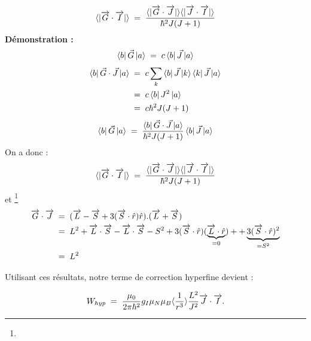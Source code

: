 \begin{equation*}
    \langle |\overrightarrow{G}\cdot\overrightarrow{I}| \rangle \; = \;  \dfrac{\langle |\overrightarrow{G}\cdot\overrightarrow{J}| \rangle\langle |\overrightarrow{J}\cdot\overrightarrow{I}| \rangle}{\hbar^2J(J+1)}
\end{equation*}
\textbf{Démonstration :}\\
\begin{equation*}
    \bra{b}\vec{G}\ket{a}
    \; = \; c\bra{b}\vec{J}\ket{a}
\end{equation*}
\begin{align*}
    \bra{b}\vec{G} \cdot \vec{J}\ket{a}
    &\; = \;  c\sum_k \bra{b}\vec{J}\ket{k}\bra{k}\vec{J}\ket{a}\\
    &\; = \;  c\bra{b}J^2\ket{a}\\
    &\; = \;  c\hbar^2 J(J+1)
\end{align*}
\begin{equation*}
    \bra{b}\vec{G}\ket{a} \; = \; \dfrac{\bra{b}\vec{G} \cdot \vec{J}\ket{a}}{\hbar^2 J(J+1)}\bra{b}\vec{J}\ket{a}
\end{equation*}
On a donc :
\begin{equation*}
    \langle |\overrightarrow{G}\cdot\overrightarrow{I}| \rangle \; = \;  \dfrac{\langle |\overrightarrow{G}\cdot\overrightarrow{J}| \rangle\langle |\overrightarrow{J}\cdot\overrightarrow{I}| \rangle}{\hbar^2J(J+1)}
\end{equation*}
et \footnote{}
\begin{align*}
    \overrightarrow{G}\cdot\overrightarrow{J} 
    &\; = \;  (\overrightarrow{L}-\overrightarrow{S}+3(\overrightarrow{S}\cdot\hat{r})\hat{r}).(\overrightarrow{L}+\overrightarrow{S})\\ 
    &\; = \; L^2 + \overrightarrow{L}\cdot\overrightarrow{S} -\overrightarrow{L}\cdot\overrightarrow{S} - S^2 + 3 (\overrightarrow{S}\cdot\hat{r})(\underbrace{\overrightarrow{L}\cdot\hat{r}}_{= 0}) + +\underbrace{3(\overrightarrow{S}\cdot\hat{r})^2}_{=S^2}\\
    &\; = \;  L^2
\end{align*}

Utilisant ces résultats, notre terme de correction hyperfine devient : 

\begin{equation}
    W_{hyp} \; = \;  \dfrac{\mu_0}{2\pi\hbar^2}g_I\mu_N\mu_B\langle\dfrac{1}{r^3}\rangle \dfrac{L^2}{J^2}\overrightarrow{J}\cdot\overrightarrow{I}.
\end{equation}

